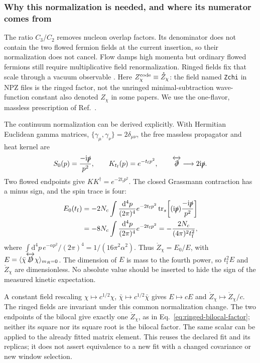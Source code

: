 \documentclass[11pt]{article}
\numberwithin{equation}{section}
\newcommand{\dd}{\mathrm{d}}
\newcommand{\ii}{\mathrm{i}}
\newcommand{\tf}{t_{\mathrm f}}
\begin{document}
\subsubsection{Why this normalization is needed, and where its numerator comes from}
\label{sec:ringed-derivation-detail}

The ratio \(C_3/C_2\) removes nucleon overlap factors. Its denominator does
not contain the two flowed fermion fields at the current insertion, so their
normalization does not cancel. Flow damps high momenta but ordinary flowed
fermions still require multiplicative field renormalization. Ringed fields
fix that scale through a vacuum observable \cite{MakinoSuzuki2014}.
Here \(Z_\chi^{\rm code}\equiv\mathring Z_\chi\): the field
named \texttt{Zchi} in NPZ files is the ringed factor, not the unringed
minimal-subtraction wave-function constant also denoted \(Z_\chi\) in some
papers. We use the one-flavor, massless prescription of
Ref.~\cite{BrambillaWang2024}.

The continuum normalization can be derived explicitly. With Hermitian
Euclidean gamma matrices, \(\{\gamma_\mu,\gamma_\nu\}=2\delta_{\mu\nu}\),
the free massless propagator and heat kernel are
\begin{equation}
 S_0(p)=\frac{-\ii\slashed p}{p^2},\qquad
 K_{\tf}(p)=e^{-\tf p^2},\qquad
 \overleftrightarrow{\slashed\partial}\longrightarrow 2\ii\slashed p.
\end{equation}
Two flowed endpoints give \(K K^\dagger=e^{-2\tf p^2}\). The closed
Grassmann contraction has a minus sign, and the spin trace is four:
\begin{align}
 E_0(\tf)
 &=-2N_c\int\frac{\dd^4p}{(2\pi)^4}e^{-2\tf p^2}
       \operatorname{tr}_{s}\!\left[(\ii\slashed p)
                                  \frac{-\ii\slashed p}{p^2}\right]
 \nonumber\\
 &=-8N_c\int\frac{\dd^4p}{(2\pi)^4}e^{-2\tf p^2}
  =-\frac{2N_c}{(4\pi)^2\tf^2},
 \label{eq:ringed-free-numerator}
\end{align}
where \(\int\dd^4p\,e^{-\alpha p^2}/(2\pi)^4=1/(16\pi^2\alpha^2)\).
Thus \(\mathring Z_\chi=E_0/E\), with
\(E=\langle\bar\chi\overleftrightarrow{\slashed D}\chi\rangle_{m_R=0}\).
The dimension of \(E\) is mass to the fourth power, so \(\tf^2E\) and
\(\mathring Z_\chi\) are dimensionless. No absolute value should be
inserted to hide the sign of the measured kinetic expectation.

A constant field rescaling \(\chi\mapsto c^{1/2}\chi\),
\(\bar\chi\mapsto c^{1/2}\bar\chi\) gives \(E\mapsto cE\) and
\(\mathring Z_\chi\mapsto\mathring Z_\chi/c\). The ringed fields
are invariant under this common normalization change. The two endpoints of
the bilocal give exactly one \(\mathring Z_\chi\), as in
Eq.~\eqref{eq:ringed-bilocal-factor}; neither its square nor its square root
is the bilocal factor. The same scalar can be applied to the already fitted
matrix element. This reuses the declared fit and its replicas; it does not
assert equivalence to a new fit with a changed covariance or new window selection.
\end{document}
